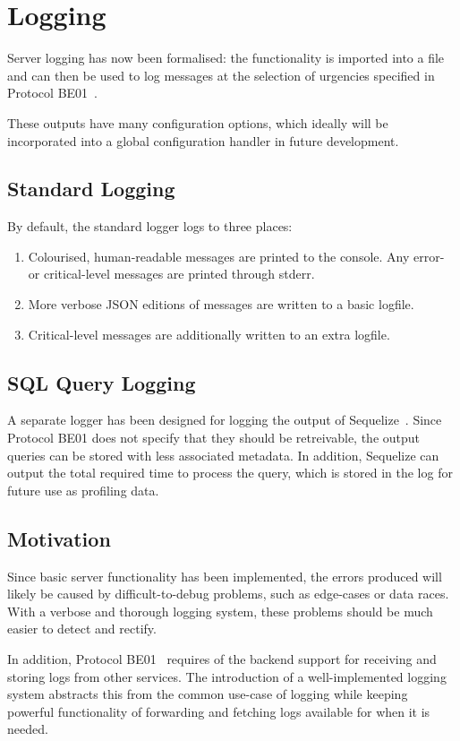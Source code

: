 \section{Logging}
Server logging has now been formalised: the functionality is imported into
a file and can then be used to log messages at the selection of urgencies
specified in Protocol BE01~\cite{protocol}.

These outputs have many configuration options, which ideally will be
incorporated into a global configuration handler in future development.

\subsection{Standard Logging}
By default, the standard logger logs to three places:
\begin{enumerate}
	\item Colourised, human-readable messages are printed to the console.
		Any error- or critical-level messages are printed through stderr.
	\item More verbose JSON editions of messages are written to a basic
		logfile.
	\item Critical-level messages are additionally written to an extra
		logfile.
\end{enumerate}

\subsection{SQL Query Logging}
A separate logger has been designed for logging the output of
Sequelize~\cite{sequelize}. Since Protocol BE01 does not specify that they
should be retreivable, the output queries can be stored with less associated
metadata. In addition, Sequelize can output the total required time to
process the query, which is stored in the log for future use as profiling
data.

\subsection{Motivation}
Since basic server functionality has been implemented, the errors produced
will likely be caused by difficult-to-debug problems, such as edge-cases or
data races. With a verbose and thorough logging system, these problems
should be much easier to detect and rectify.

In addition, Protocol BE01~\cite{protocol} requires of the backend support
for receiving and storing logs from other services. The introduction of a
well-implemented logging system abstracts this from the common use-case of
logging while keeping powerful functionality of forwarding and fetching logs
available for when it is needed.

